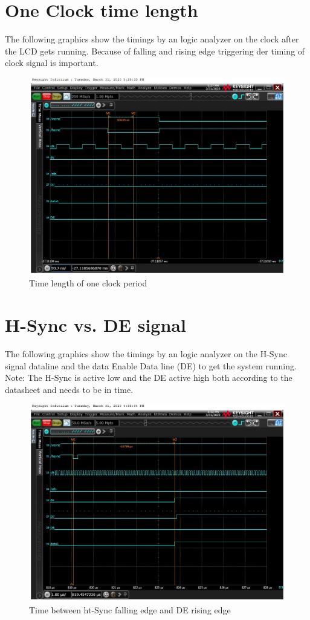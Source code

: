 \pagebreak
\section{One Clock time length}%
The following graphics show the timings by an logic analyzer on the clock
after the LCD gets running. Because of falling and rising edge triggering der
timing of clock signal is important.
\label{sub:clock_time_length}
\begin{figure}[h!]
\begin{center}
    \includegraphics[width=14cm]{pictures/lcd_timings/periode_time_1clk.jpg}
\end{center}
\caption{Time length of one clock period}
\label{fig:one_clock_time}
\end{figure}


\pagebreak
\section{H-Sync vs. DE signal}%
\label{sub:other_measured_lcd_timings}
The following graphics show the timings by an logic analyzer on the H-Sync
signal dataline and the data Enable Data line (DE) to get the system
running. Note: The H-Sync is active low and the DE active high both according to
the datasheet and needs to be in time.

\begin{figure}[h!]
\begin{center}
    \includegraphics[width=14cm]{pictures/lcd_timings/hsync_falling_de_rising.jpg}
\end{center}
\caption{Time between ht-Sync falling edge and DE rising edge}
\label{fig:hsync_de}
\end{figure}
